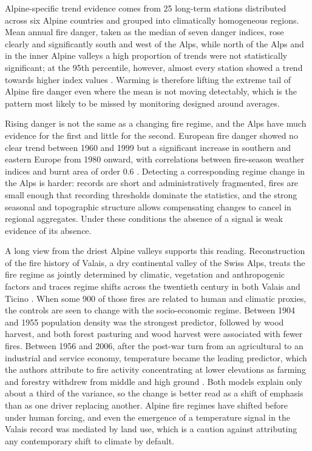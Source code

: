 \documentclass[11pt,a4paper]{article}
\begin{document}
Alpine-specific trend evidence comes from 25 long-term stations distributed across six Alpine countries and grouped into climatically homogeneous regions. Mean annual fire danger, taken as the median of seven danger indices, rose clearly and significantly south and west of the Alps, while north of the Alps and in the inner Alpine valleys a high proportion of trends were not statistically significant; at the 95th percentile, however, almost every station showed a trend towards higher index values \citep{wastl_recent_2012}. Warming is therefore lifting the extreme tail of Alpine fire danger even where the mean is not moving detectably, which is the pattern most likely to be missed by monitoring designed around averages.

Rising danger is not the same as a changing fire regime, and the Alps have much evidence for the first and little for the second. European fire danger showed no clear trend between 1960 and 1999 but a significant increase in southern and eastern Europe from 1980 onward, with correlations between fire-season weather indices and burnt area of order 0.6 \citep{venalainen_temporal_2014}. Detecting a corresponding regime change in the Alps is harder: records are short and administratively fragmented, fires are small enough that recording thresholds dominate the statistics, and the strong seasonal and topographic structure allows compensating changes to cancel in regional aggregates. Under these conditions the absence of a signal is weak evidence of its absence.

A long view from the driest Alpine valleys supports this reading. Reconstruction of the fire history of Valais, a dry continental valley of the Swiss Alps, treats the fire regime as jointly determined by climatic, vegetation and anthropogenic factors and traces regime shifts across the twentieth century in both Valais and Ticino \citep{zumbrunnen_reconstructing_2010}. When some 900 of those fires are related to human and climatic proxies, the controls are seen to change with the socio-economic regime. Between 1904 and 1955 population density was the strongest predictor, followed by wood harvest, and both forest pasturing and wood harvest were associated with fewer fires. Between 1956 and 2006, after the post-war turn from an agricultural to an industrial and service economy, temperature became the leading predictor, which the authors attribute to fire activity concentrating at lower elevations as farming and forestry withdrew from middle and high ground \citep{zumbrunnen_human_2012}. Both models explain only about a third of the variance, so the change is better read as a shift of emphasis than as one driver replacing another. Alpine fire regimes have shifted before under human forcing, and even the emergence of a temperature signal in the Valais record was mediated by land use, which is a caution against attributing any contemporary shift to climate by default.
\end{document}
